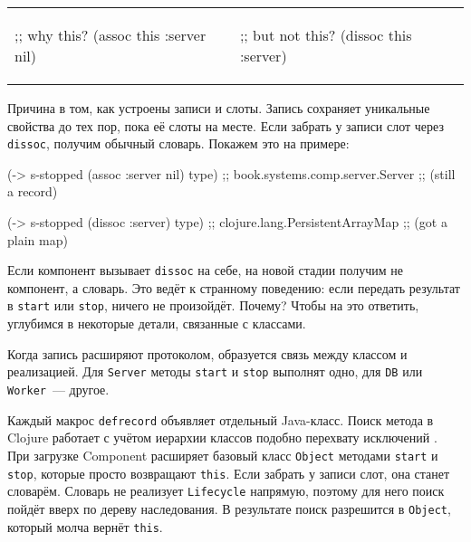\else

\begin{english}

\noindent
\begin{tabular}{ @{}p{5cm} @{}p{5cm} }

  \begin{clojure}
;; why this?
(assoc this :server nil)
  \end{clojure}

&

  \begin{clojure}
;; but not this?
(dissoc this :server)
  \end{clojure}

\end{tabular}

\end{english}

\fi

Причина в том, как устроены записи и слоты. Запись сохраняет уникальные свойства
до тех пор, пока её слоты на месте. Если забрать у записи слот через
\verb|dissoc|, получим обычный словарь. Покажем это на примере:

\begin{english}
  \begin{clojure}
(-> s-stopped
    (assoc :server nil)
    type)
;; book.systems.comp.server.Server
;; (still a record)

(-> s-stopped
    (dissoc :server)
    type)
;; clojure.lang.PersistentArrayMap
;; (got a plain map)
  \end{clojure}
\end{english}

Если компонент вызывает \verb|dissoc| на себе, на новой стадии получим не
компонент, а словарь. Это ведёт к странному поведению: если передать результат в
\verb|start| или \verb|stop|, ничего не произойдёт. Почему? Чтобы на это
ответить, углубимся в некоторые детали, связанные с классами.

Когда запись расширяют протоколом, образуется связь между классом и
реализацией. Для \verb|Server| методы \verb|start| и \verb|stop| выполнят
одно, для \verb|DB| или \verb|Worker|~--- другое.

Каждый макрос \verb|defrecord| объявляет отдельный Java-класс. Поиск метода в
Clojure работает с учётом иерархии классов подобно перехвату
исключений . При загрузке Component расширяет базовый класс
\verb|Object| методами \verb|start| и \verb|stop|, которые просто возвращают
\verb|this|. Если забрать у записи слот, она станет словарём. Словарь не
реализует \verb|Lifecycle| напрямую, поэтому для него поиск пойдёт вверх по
дереву наследования. В результате поиск разрешится в \verb|Object|, который
молча вернёт \verb|this|.

